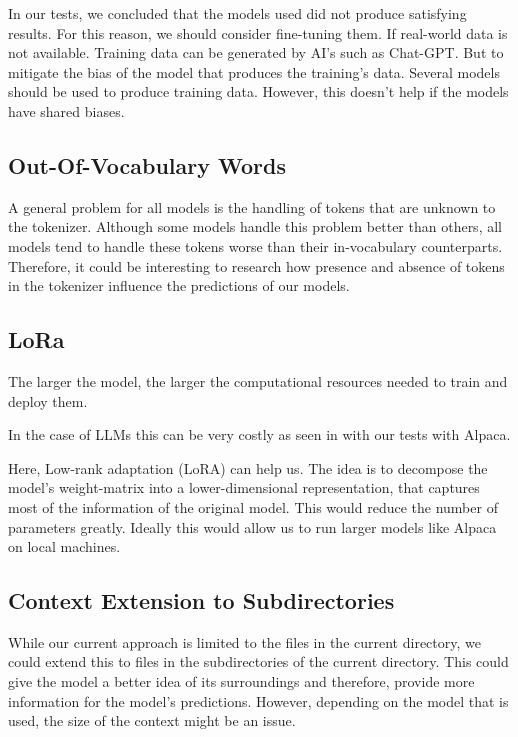 In our tests, we concluded that the models used did not produce satisfying results. For this reason, we should consider fine-tuning them. If real-world data is not available. Training data can be generated by AI's such as Chat-GPT. But to mitigate the bias of the model that produces the training's data. Several models should be used to produce training data. However, this doesn't help if the models have shared biases.





\subsection{Out-Of-Vocabulary Words}


A general problem for all models is the handling of tokens that are unknown to the tokenizer. Although some models handle this problem better than others, all models tend to handle these tokens worse than their in-vocabulary counterparts. Therefore, it could be interesting to research how  presence and absence of tokens in the tokenizer influence the predictions of our models.



\subsection{LoRa}

The larger the model, the larger the computational resources needed to train and deploy them.

In the case of LLMs this can be very costly as seen in with our tests with Alpaca. 

Here,  Low-rank adaptation (LoRA) can help us. The idea is to decompose the model's weight-matrix into a lower-dimensional representation, that captures most of the information of the original model. This would reduce the number of parameters greatly. Ideally this would allow us to run larger models like Alpaca on local machines.


\subsection{Context Extension to Subdirectories}


While our current approach is limited to the files in the current directory, we could extend this to files in the subdirectories of the current directory. This could give the model a better idea of its surroundings and therefore, provide more information for the model's predictions. However, depending on the model that is used, the size of the context might be an issue.



